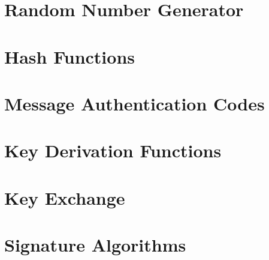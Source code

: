 \documentclass[11pt,a4paper]{report}
\theoremstyle{definitionstyle}
\begin{document}
\section{Random Number Generator}

\section{Hash Functions}

\section{Message Authentication Codes}

\section{Key Derivation Functions}

\section{Key Exchange}

\section{Signature Algorithms}
\end{document}
